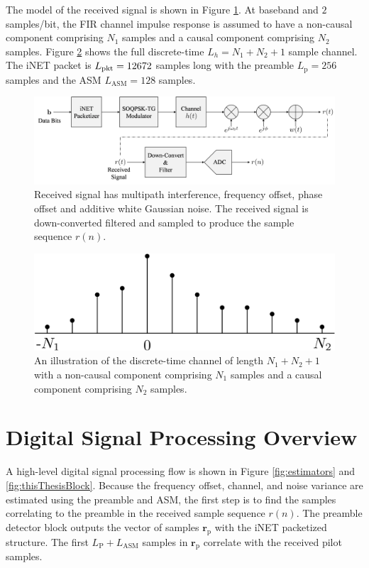 The model of the received signal is shown in Figure \ref{fig:received1}.
At baseband and $2$ samples/bit, the FIR channel impulse response is assumed to have a non-causal component comprising $N_1$ samples and a causal component comprising $N_2$ samples.
Figure \ref{fig:channelExample} shows the full discrete-time $L_h = N_1+N_2+1$ sample channel.
The iNET packet is $L_\text{pkt}=12672$ samples long with the preamble $L_\text{p}=256$ samples and the ASM $L_\text{ASM}=128$ samples.
\begin{figure}
	\centering\includegraphics[width=12.33in/100*50]{figures/intro/received1.pdf}
	\caption{Received signal has multipath interference, frequency offset, phase offset and additive white Gaussian noise. The received signal is down-converted filtered and sampled to produce the sample sequence $r(n)$.}
	\label{fig:received1}
\end{figure}
\begin{figure}
	\centering\includegraphics[width=5.5in/100*55]{figures/intro/channelExample.pdf}
	\caption{An illustration of the discrete-time channel of length $N_1+N_2+1$ with a non-causal component comprising $N_1$ samples and a causal component comprising $N_2$ samples.}
	\label{fig:channelExample}
\end{figure}

\section{Digital Signal Processing Overview}
\label{sec:signalProcessing}
A high-level digital signal processing flow is shown in Figure \ref{fig:estimators} and \ref{fig:thisThesisBlock}.
Because the frequency offset, channel, and noise variance are estimated using the preamble and ASM, the first step is to find the samples correlating to the preamble in the received sample sequence $r(n)$.
The preamble detector block outputs the vector of samples $\mathbf{r}_\text{p}$ with the iNET packetized structure.
The first $L_\text{P} + L_\text{ASM}$ samples in $\mathbf{r}_\text{p}$ correlate with the received pilot samples.

